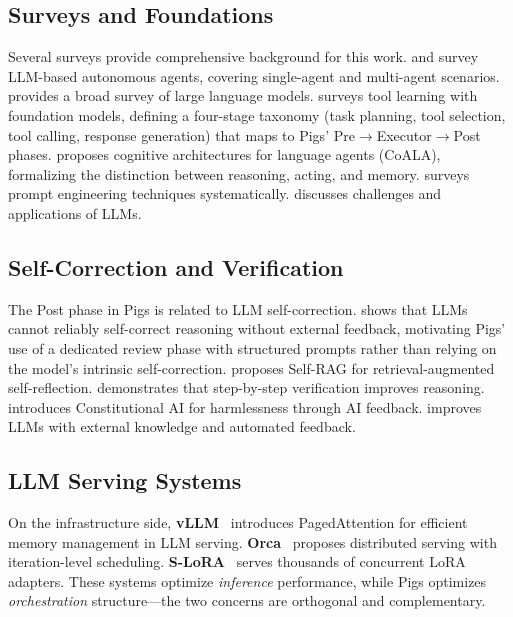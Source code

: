 \subsection{Surveys and Foundations}

Several surveys provide comprehensive background for this work. \citet{xi2023rise} and \citet{wang2023agent_survey} survey LLM-based autonomous agents, covering single-agent and multi-agent scenarios. \citet{zhao2023llm_survey} provides a broad survey of large language models. \citet{qin2023tool_learning_survey} surveys tool learning with foundation models, defining a four-stage taxonomy (task planning, tool selection, tool calling, response generation) that maps to Pigs' Pre$\rightarrow$Executor$\rightarrow$Post phases. \citet{sumers2023coala} proposes cognitive architectures for language agents (CoALA), formalizing the distinction between reasoning, acting, and memory. \citet{schulhoff2024prompt} surveys prompt engineering techniques systematically. \citet{kaddour2023challenges} discusses challenges and applications of LLMs.

\subsection{Self-Correction and Verification}

The Post phase in Pigs is related to LLM self-correction. \citet{huang2024selfcorrect} shows that LLMs cannot reliably self-correct reasoning without external feedback, motivating Pigs' use of a dedicated review phase with structured prompts rather than relying on the model's intrinsic self-correction. \citet{asai2023selfrag} proposes Self-RAG for retrieval-augmented self-reflection. \citet{lightman2023verify} demonstrates that step-by-step verification improves reasoning. \citet{bai2022constitutional} introduces Constitutional AI for harmlessness through AI feedback. \citet{peng2023checkfacts} improves LLMs with external knowledge and automated feedback.

\subsection{LLM Serving Systems}

On the infrastructure side, \textbf{vLLM}~\citep{kwon2023vllm} introduces PagedAttention for efficient memory management in LLM serving. \textbf{Orca}~\citep{yu2022orca} proposes distributed serving with iteration-level scheduling. \textbf{S-LoRA}~\citep{sheng2023slora} serves thousands of concurrent LoRA adapters. These systems optimize \emph{inference} performance, while Pigs optimizes \emph{orchestration} structure---the two concerns are orthogonal and complementary.

